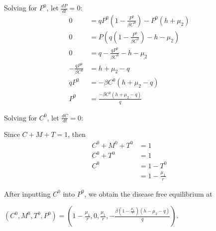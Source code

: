 \documentclass[12pt]{article}
\begin{document}
        Solving for $P^{0}$, let $\frac{dP}{dt} = 0$:
            \begin{align*}
                0 &= qP^{0} \left( 1-\frac{P^{0}}{\beta C^{0}}\right) - P^{0}(h + \mu_{2}) \\
                0 &= P\left( q\left(1- \frac{P^{0}}{\beta C^{0}} \right) - h - \mu_{2} \right) \\
                0 &= q - \frac{qP^{0}}{\beta C^{0}} - h - \mu_{2} \\
                -\frac{qP^{0}}{\beta C^{0}} &= h + \mu_{2} -q \\
                qP^{0} &= -\beta C^{0}(h + \mu_{2} - q) \\
                P^{0} &= \frac{-\beta C^{0}(h + \mu_{2} - q)}{q}
            \end{align*}
            
        Solving for $C^{0}$, let $\frac{dC}{dt} = 0$: \\ \par
        Since $C + M + T = 1$, then
            \begin{align*}
                C^{0} + M^{0} + T^{0} &= 1 \\
                C^{0} + T^{0} &= 1 \\
                C^{0}  &= 1 - T^{0} \\
                &= 1 - \frac{\mu_{1}}{r}
            \end{align*}
            
        After inputting $C^{0}$ into $P^{0}$, we obtain the disease free equilibrium at \\
        \begin{center}
        $\displaystyle{(C^{0}, M^{0}, T^{0}, P^{0}) = \left(1 - \frac{\mu_{1}}{r}, 0, \frac{\mu_{1}}{r}, -\frac{\beta(1 - \frac{\mu_{1}}{r})(h - \mu_{2} - q)}{q }\right)}$. 
        \end{center}
        
\end{document}
